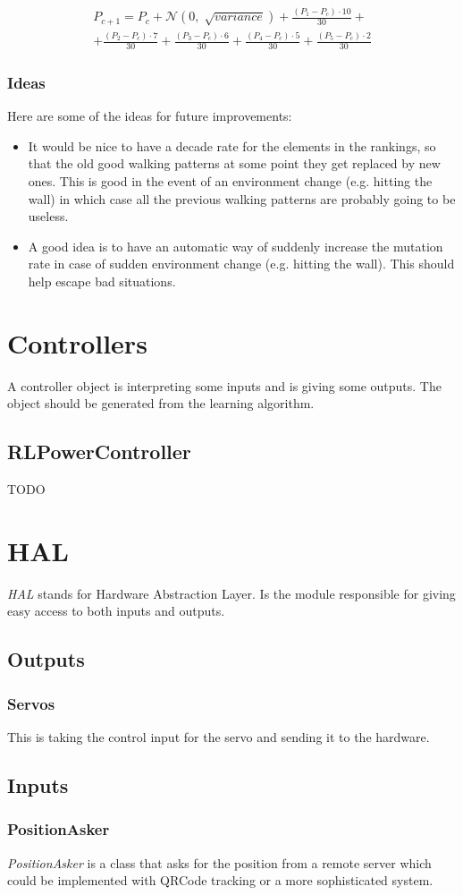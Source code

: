 \documentclass[a4paper,10pt]{article}
\begin{document}
\begin{multline}
 P_{c+1} = P_c + \mathcal{N}\left(0, \sqrt[]{variance}\right) 
   + \frac{(P_1 - P_c) \cdot 10}{30} +\\
   + \frac{(P_2 - P_c) \cdot 7 }{30}
   + \frac{(P_3 - P_c) \cdot 6 }{30}
   + \frac{(P_4 - P_c) \cdot 5 }{30}
   + \frac{(P_5 - P_c) \cdot 2 }{30}
\end{multline}

\subsubsection{Ideas}
Here are some of the ideas for future improvements:
\begin{itemize}
 \item It would be nice to have a decade rate for the elements in the rankings,
 so that the old good walking patterns at some point they get replaced by new 
 ones. This is good in the event of an environment change (e.g. hitting the 
 wall) in which case all the previous walking patterns are probably going to be
 useless.
 \item A good idea is to have an automatic way of suddenly increase the mutation
 rate in case of sudden environment change (e.g. hitting the wall). This should
 help escape bad situations.
\end{itemize}


\section{Controllers}
A controller object is interpreting some inputs and is giving some outputs. The
object should be generated from the learning algorithm.

\subsection{RLPowerController}
TODO

\section{HAL}
\emph{HAL} stands for Hardware Abstraction Layer. Is the module responsible for
giving easy access to both inputs and outputs.

\subsection{Outputs}
\subsubsection{Servos}
This is taking the control input for the servo and sending it to the hardware.

\subsection{Inputs}
\subsubsection{PositionAsker}
\emph{PositionAsker} is a class that asks for the position from a remote server
which could be implemented with QRCode tracking or a more sophisticated system.
\end{document}
